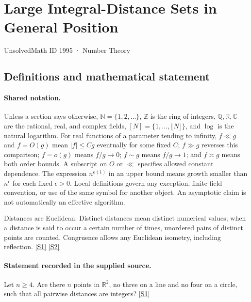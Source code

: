 \documentclass[11pt,a4paper]{article}
\newcommand{\N}{\mathbb{N}}
\newcommand{\Z}{\mathbb{Z}}
\newcommand{\Q}{\mathbb{Q}}
\newcommand{\R}{\mathbb{R}}
\newcommand{\C}{\mathbb{C}}
\newcommand{\sref}[2]{\hyperlink{source:#1:#2}{[S#2]}}
\begin{document}

\setcounter{section}{1994}

\section{Large Integral-Distance Sets in General Position}\label{1995}

{\small\sffamily UnsolvedMath ID 1995 · Number Theory}

\subsection{Definitions and mathematical statement}

\paragraph{Shared notation.}Unless a section says otherwise, $\N=\{1,2,\ldots\}$,
$\Z$ is the ring of integers, $\Q,\R,\C$ are the rational, real, and complex
fields, $[N]=\{1,\ldots,\lfloor N\rfloor\}$, and $\log$ is the natural
logarithm. For real functions of a parameter tending to infinity,
$f\ll g$ and $f=O(g)$ mean $|f|\leq Cg$ eventually for some fixed $C$;
$f\gg g$ reverses this comparison; $f=o(g)$ means $f/g\to0$;
$f\sim g$ means $f/g\to1$; and $f\asymp g$ means both order bounds.
A subscript on $O$ or $\ll$ specifies allowed constant dependence.
The expression $n^{o(1)}$ in an upper bound means growth smaller than
$n^\epsilon$ for each fixed $\epsilon>0$. Local definitions govern any
exception, finite-field convention, or use of the same symbol for another
object. An asymptotic claim is not automatically an effective algorithm.



Distances are Euclidean. Distinct distances mean distinct numerical values; when a distance is said to occur a certain number of times, unordered pairs of distinct points are counted. Congruence allows any Euclidean isometry, including reflection. \sref{1995}{1} \sref{1995}{2}

\paragraph{Statement recorded in the supplied source.}
Let $n\geq 4$. Are there $n$ points in $\mathbb{R}^2$, no three on a line and no four on a circle, such that all pairwise distances are integers? \sref{1995}{1}
\end{document}
